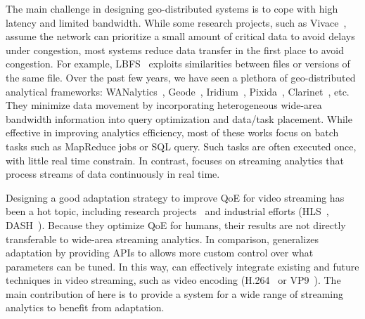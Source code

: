 The main challenge in designing geo-distributed
systems is to cope with high latency and limited bandwidth. While some research
projects, such as Vivace~\cite{cho2012surviving}, assume the network can
prioritize a small amount of critical data to avoid delays under congestion,
most systems reduce data transfer in the first place to avoid congestion. For
example, LBFS~\cite{muthitacharoen2001low} exploits similarities between files
or versions of the same file. Over the past few years, we have seen a plethora
of geo-distributed analytical frameworks:
WANalytics~\cite{vulimiri2015wananlytics}, Geode~\cite{vulimiri2015global},
Iridium~\cite{pu2015low}, Pixida~\cite{kloudas2015pixida},
Clarinet~\cite{viswanathan2016clarinet}, etc. They minimize data movement by
incorporating heterogeneous wide-area bandwidth information into query
optimization and data/task placement. While effective in improving analytics
efficiency, most of these works focus on batch tasks such as MapReduce jobs or
SQL query. Such tasks are often executed once, with little real time
constrain. In contrast, \sysname{} focuses on streaming analytics that process
streams of data continuously in real time.









 Designing a good adaptation strategy to improve
QoE for video streaming has been a hot topic, including research
projects~\cite{yin2015control, sun2016cs2p} and industrial efforts
(HLS~\cite{pantos2016http}, DASH~\cite{sodagar2011mpeg,
  michalos2012dynamic}). Because they optimize QoE for humans, their results are
not directly transferable to wide-area streaming analytics. In comparison,
\sysname{} generalizes adaptation by providing \maybe{} APIs to allows more
custom control over what parameters can be tuned. In this way, \sysname{} can
effectively integrate existing and future techniques in video streaming, such as
video encoding (H.264~\cite{richardson2011h} or VP9~\cite{grange2016vp9}). The
main contribution of \sysname{} here is to provide a system for a wide range of
streaming analytics to benefit from adaptation.

